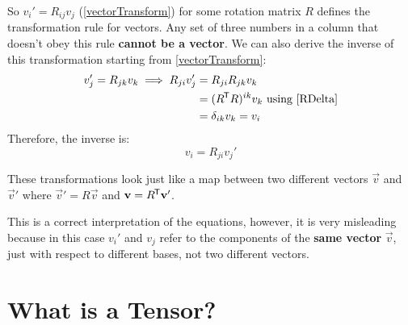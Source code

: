 \documentclass[../main.tex]{subfiles}
\begin{document}
So $v_i' = R_{i j}v_j$ (\cref{vectorTransform}) for some rotation matrix $R$ defines the transformation rule for vectors.
Any set of three numbers in a column that doesn't obey this rule \textbf{cannot be a vector}.
We can also derive the inverse of this transformation starting from \cref{vectorTransform}:
\begin{align*}
  v_j' = R_{j k}v_k \implies R_{ji}v_j' &= R_{j i}R_{j k}v_k \\
                                        &= (R^{\trans} R)^{i k} v_k \text{ using \cref{RDelta}}\\
                                        &= \delta_{i k}v_k = v_i
\end{align*}
Therefore, the inverse is:
\begin{equation}
  v_i = R_{j i}v_j' \label{invVectorTransform}
\end{equation}
\begin{remark}
  These transformations look just like a map between two different vectors $\vec{v}$ and $\vec{v}'$ where $\vec{v}' = R \vec{v}$ and $\mathbf{\bm{v}} = R^{{\mkern-1.5mu\mathsf{T}}} \mathbf{\bm{v}}'$.

  This is a correct interpretation of the equations, however, it is very misleading because in this case $v_i'$ and $v_j$ refer to the components of the \textbf{same vector} $\vec{v}$, just with respect to different bases, not two different vectors.
\end{remark}
\section{What is a Tensor?}
\end{document}
